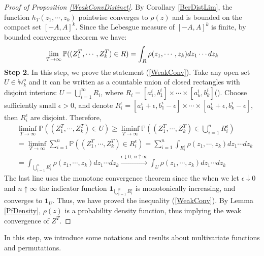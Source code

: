 \begin{proof}[Proof of Proposition \ref{WeakConvDistinct}]
By Corollary \ref{BerDistLim}, the function $h_{T}(z_{1},\cdots,z_{k})$ pointwise converges to $\rho(z)$ and is bounded on the compact set $[-A,A]^{k}$. Since the Lebesgue measure of $[-A,A]^{k}$ is finite, by bounded convergence theorem we have:
\begin{align}{\label{ConvOnRect}}
	\lim_{T\rightarrow\infty}\mathbb{P}((Z_{1}^{T},\cdots,Z_{k}^{T})\in R)=\int_{R}\rho(z_{1},\cdots,z_{k})dz_{1}\cdots dz_{k}
\end{align}
\textbf{Step 2. }In this step, we prove the statement (\ref{WeakConv}). Take any open set $U\in \mathbb{W}_{k}^{o}$ and it can be written as a countable union of closed rectangles with disjoint interiors: $U=\bigcup_{i=1}^{\infty}R_{i}$, where $R_{i}=[a_{1}^{i},b_{1}^{i}]\times\cdots\times[a_{k}^{i},b_{k}^{i}]$(\cite[Theorem 1.4]{Stein}). Choose sufficiently small $\epsilon>0$, and denote $R_{i}^{\epsilon}=[a_{1}^{i}+\epsilon,b_{1}^{i}-\epsilon]\times\cdots\times[a_{k}^{i}+\epsilon,b_{k}^{i}-\epsilon]$, then $R_{i}^{\epsilon}$ are disjoint. Therefore,
\begin{align*}
	&\liminf_{T\rightarrow\infty}\mathbb{P}((Z_{1}^{T},\cdots,Z_{k}^{T})\in U)\geq\liminf_{T\rightarrow\infty}\mathbb{P}((Z_{1}^{T},\cdots,Z_{k}^{T})\in \bigcup_{i=1}^{n}R_{i}^{\epsilon})\\
	&=\liminf_{T\rightarrow\infty}\sum_{i=1}^{n}\mathbb{P}((Z_{1}^{T},\cdots,Z_{k}^{T})\in R_{i}^{\epsilon})=\sum_{i=1}^{n}\int_{R_{i}^{\epsilon}}\rho(z_1,\cdots,z_{k})dz_{1}\cdots dz_{k}\\
	&=\int_{\bigcup_{i=1}^{n}R_{i}^{\epsilon}}\rho(z_1,\cdots,z_{k})dz_{1}\cdots dz_{k} \xrightarrow{\epsilon\downarrow 0,\ n\uparrow\infty} \int_{U}\rho(z_1,\cdots,z_{k})dz_{1}\cdots dz_{k}
\end{align*}
The last line uses the monotone convergence theorem since the when we let $\epsilon\downarrow 0$ and $n\uparrow\infty$ the indicator function $\mathbf{1}_{\bigcup_{i=1}^{n}R_{i}^{\epsilon}}$ is monotonically increasing, and converges to $\mathbf{1}_{U}$. Thus, we have proved the inequality (\ref{WeakConv}). By Lemma \ref{PfDensity}, $\rho(z)$ is a probability density function, thus implying the weak convergence of $Z^{T}$.
\end{proof}

\label{multivar} In this step, we introduce some notations and results about multivariate functions and permutations.

